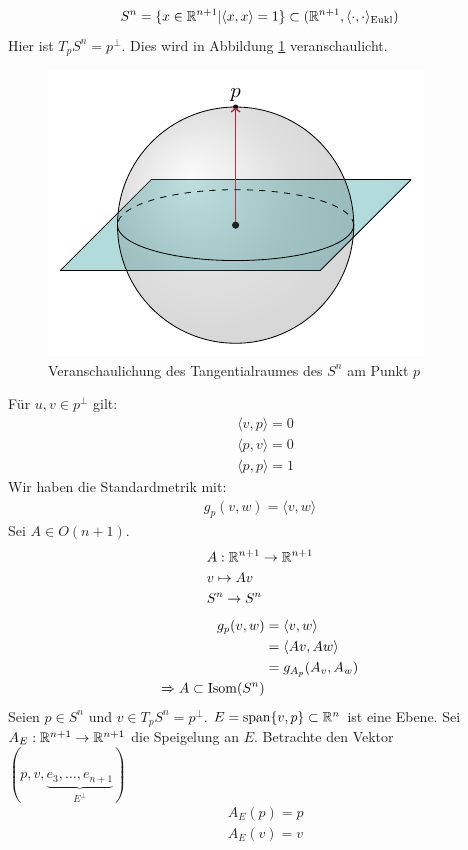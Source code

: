 \begin{bsp}
\begin{align}
S^n = \{ x \in \mathbb{R}^{n+1} \vert \langle x, x\rangle  = 1\} \subset (\mathbb{R}^{n+1}, \langle \cdot, \cdot \rangle_{\mathrm{Eukl}})
\end{align}
Hier ist $T_p S^n = p^\perp$.
Dies wird in Abbildung \ref{img:sphere_tangent_space} veranschaulicht.
\begin{figure}[H]
\centering
\includegraphics[width=0.4\linewidth]{figures/tikz/sphere_tangent_space.pdf}
\caption{Veranschaulichung des Tangentialraumes des $S^n$ am Punkt $p$}
\label{img:sphere_tangent_space}
\end{figure} 	
Für $u, v \in p^\perp$ gilt:
\begin{align*}
& \langle v, p \rangle = 0\\
& \langle p, v \rangle = 0\\
& \langle p, p \rangle = 1
\end{align*}
Wir haben die Standardmetrik mit:
\begin{align*}
g_p (v, w) = \langle v, w\rangle 
\end{align*}
Sei $A \in O(n+1)$.
\begin{align*}
& A: \mathbb{R}^{n+1} \to \mathbb{R}^{n+1}\\
& v \mapsto A v \\
& S^n \to S^n
\end{align*}
\begin{align*}
g_p (v, w) &= \langle v, w\rangle\\
&= \langle Av, Aw \rangle\\ 
&= g_{A_p} (A_v, A_w)\\
\Rightarrow A \subset \operatorname{Isom} (S^n)
\end{align*}
Seien $p \in S^n$ und $v \in T_p S^n = p^\perp$.
$E = \mathrm{span} \{ v, p \} \subset \mathbb{R}^n$ ist eine Ebene.
Sei $A_E : \mathbb{R}^{n+1} \to \mathbb{R}^{n+1}$ die Speigelung an $E$.
Betrachte den Vektor $(p, v, \underbrace{e_3, \dots, e_{n+1}}_{E^\perp})$
\begin{align*}
&A_E (p) = p\\
& A_E (v) = v\\

\end{align*}
\end{bsp}
